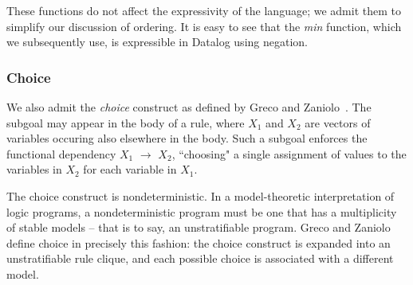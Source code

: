 \linebreak{}

These functions do not affect the expressivity of the language; we admit them
to simplify our discussion of ordering.  It is easy to see that the \emph{min} function,
which we subsequently use, is expressible in Datalog using negation.




  









\subsubsection{Choice}

We also admit the \emph{choice} construct as defined by Greco and Zaniolo~\cite{greedychoice}.
The subgoal  may appear in the body of a rule, where
\emph{$X_1$} and \emph{$X_2$} are vectors of variables occuring also elsewhere in the body.  Such a subgoal
enforces the functional dependency \emph{$X_1$} $\to$ $X_2$, ``choosing" a single assignment of values to the variables
in \emph{$X_2$} for each variable in \emph{$X_1$}.

The choice construct is nondeterministic.  In a model-theoretic interpretation of logic programs, a nondeterministic program 
must be one that has a multiplicity of stable models -- that is to say, an unstratifiable program.  Greco and Zaniolo define 
choice in precisely this fashion: the choice construct is expanded into an unstratifiable rule clique, 
and each possible choice is associated with a different model.

